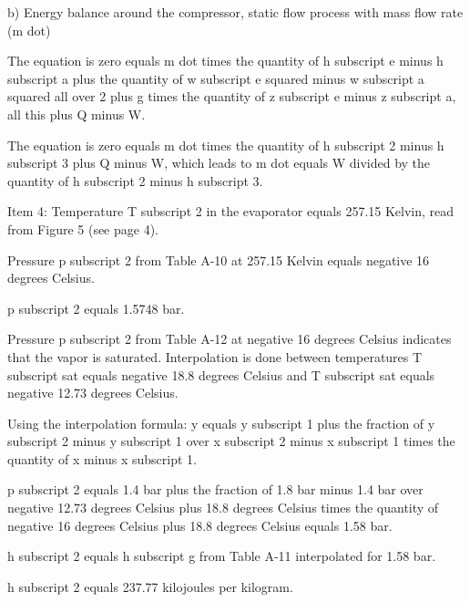 b) Energy balance around the compressor, static flow process with mass flow rate (m dot)

The equation is zero equals m dot times the quantity of h subscript e minus h subscript a plus the quantity of w subscript e squared minus w subscript a squared all over 2 plus g times the quantity of z subscript e minus z subscript a, all this plus Q minus W.

The equation is zero equals m dot times the quantity of h subscript 2 minus h subscript 3 plus Q minus W, which leads to m dot equals W divided by the quantity of h subscript 2 minus h subscript 3.

Item 4:
Temperature T subscript 2 in the evaporator equals 257.15 Kelvin, read from Figure 5 (see page 4).

Pressure p subscript 2 from Table A-10 at 257.15 Kelvin equals negative 16 degrees Celsius.

p subscript 2 equals 1.5748 bar.

Pressure p subscript 2 from Table A-12 at negative 16 degrees Celsius indicates that the vapor is saturated. Interpolation is done between temperatures T subscript sat equals negative 18.8 degrees Celsius and T subscript sat equals negative 12.73 degrees Celsius.

Using the interpolation formula:
y equals y subscript 1 plus the fraction of y subscript 2 minus y subscript 1 over x subscript 2 minus x subscript 1 times the quantity of x minus x subscript 1.

p subscript 2 equals 1.4 bar plus the fraction of 1.8 bar minus 1.4 bar over negative 12.73 degrees Celsius plus 18.8 degrees Celsius times the quantity of negative 16 degrees Celsius plus 18.8 degrees Celsius equals 1.58 bar.

h subscript 2 equals h subscript g from Table A-11 interpolated for 1.58 bar.

h subscript 2 equals 237.77 kilojoules per kilogram.